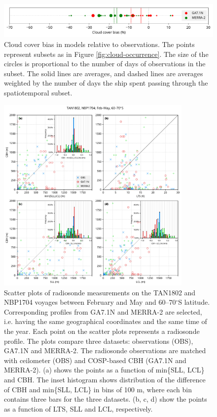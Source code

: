 \clearpage
\begin{figure}[t]
\centering
\includegraphics[width=\textwidth]{chapter2/fig/cloud_cover_hist_rev1.pdf}
\caption[Cloud cover bias in models relative to observations]{
Cloud cover bias in models relative to observations. The points represent
subsets as in Figure \ref{fig:cloud-occurrence}. The size of the circles is
proportional to the number of days of observations in the subset. The solid
lines are averages, and dashed lines are averages weighted by the number of days
the ship spent passing through the spatiotemporal subset.
}
\label{fig:cloud-cover-hist}
\end{figure}

\clearpage
\begin{figure}[t]
\centering
\includegraphics[width=0.85\textwidth]{chapter2/fig/rs_scatter_rev1.pdf}
\caption[Scatter plots of radiosonde measurements on the TAN1802 and NBP1704 voyages]{
Scatter plots of radiosonde measurements on the TAN1802 and NBP1704 voyages
between February and May and 60--70$^\circ$S latitude. Corresponding profiles
from GA7.1N and MERRA-2 are selected, i.e. having the same geographical
coordinates and the same time of the year. Each point on the scatter plots
represents a radiosonde profile. The plots compare three datasets: observations
(OBS), GA7.1N and MERRA-2. The radiosonde observations are matched with
ceilometer (OBS) and COSP-based CBH (GA7.1N and MERRA-2). (a) shows the
points as a function of min\{SLL, LCL\} and CBH. The inset histogram shows
distribution of the difference of CBH and min\{SLL, LCL\} in bins of 100
\unit{m}, where each bin contains three bars for the three datasets.
(b, c, d) show the points as a function of LTS, SLL and LCL,
respectively.
}
\label{fig:rs-scatter}
\end{figure}

